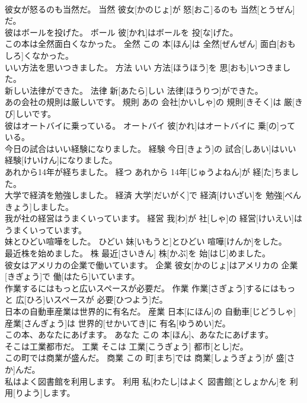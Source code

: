 \documentclass[8pt]{extreport}
\begin{document}
\begin{CJK}{UTF8}{min}
\\	彼女が怒るのも当然だ。	当然	彼女[かのじょ]が 怒[おこ]るのも 当然[とうぜん]だ。	
\\	彼はボールを投げた。	ボール	彼[かれ]はボールを 投[な]げた。	
\\	この本は全然面白くなかった。	全然	この 本[ほん]は 全然[ぜんぜん] 面白[おもしろ]くなかった。	
\\	いい方法を思いつきました。	方法	いい 方法[ほうほう]を 思[おも]いつきました。	
\\	新しい法律ができた。	法律	新[あたら]しい 法律[ほうりつ]ができた。	
\\	あの会社の規則は厳しいです。	規則	あの 会社[かいしゃ]の 規則[きそく]は 厳[きび]しいです。	
\\	彼はオートバイに乗っている。	オートバイ	彼[かれ]はオートバイに 乗[の]っている。	
\\	今日の試合はいい経験になりました。	経験	今日[きょう]の 試合[しあい]はいい 経験[けいけん]になりました。	
\\	あれから14年が経ちました。	経つ	あれから 14年[じゅうよねん]が 経[た]ちました。	
\\	大学で経済を勉強しました。	経済	大学[だいがく]で 経済[けいざい]を 勉強[べんきょう]しました。	
\\	我が社の経営はうまくいっています。	経営	我[わ]が 社[しゃ]の 経営[けいえい]はうまくいっています。	
\\	妹とひどい喧嘩をした。	ひどい	妹[いもうと]とひどい 喧嘩[けんか]をした。	
\\	最近株を始めました。	株	最近[さいきん] 株[かぶ]を 始[はじ]めました。	
\\	彼女はアメリカの企業で働いています。	企業	彼女[かのじょ]はアメリカの 企業[きぎょう]で 働[はたら]いています。	
\\	作業するにはもっと広いスペースが必要だ。	作業	作業[さぎょう]するにはもっと 広[ひろ]いスペースが 必要[ひつよう]だ。	
\\	日本の自動車産業は世界的に有名だ。	産業	日本[にほん]の 自動車[じどうしゃ] 産業[さんぎょう]は 世界的[せかいてき]に 有名[ゆうめい]だ。	
\\	この本、あなたにあげます。	あなた	この 本[ほん]、あなたにあげます。	
\\	そこは工業都市だ。	工業	そこは 工業[こうぎょう] 都市[とし]だ。	
\\	この町では商業が盛んだ。	商業	この 町[まち]では 商業[しょうぎょう]が 盛[さか]んだ。	
\\	私はよく図書館を利用します。	利用	私[わたし]はよく 図書館[としょかん]を 利用[りよう]します。	

\end{CJK}
\end{document}
